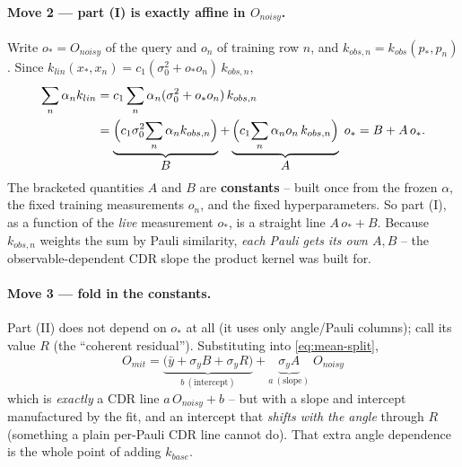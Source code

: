 \documentclass[11pt]{article}
\def\bm#1{#1}%
\def\mathrm#1{#1}%
\begin{document}
\paragraph{Move 2 --- part (I) is exactly affine in $O_{\mathrm{noisy}}$.}
Write $o_*=O_{\mathrm{noisy}}$ of the query and $o_n$ of training row $n$, and
$k_{\mathrm{obs},n}=k_{\mathrm{obs}}(\bm p_*,\bm p_n)$. Since
$k_{\mathrm{lin}}(\bm x_*,\bm x_n)=c_1(\sigma_0^2+o_* o_n)\,k_{\mathrm{obs},n}$,
\begin{align}
\sum_n\alpha_n k_{\mathrm{lin}}
&=c_1\sum_n\alpha_n(\sigma_0^2+o_* o_n)\,k_{\mathrm{obs},n}\notag\\
&=\underbrace{\Big(c_1\sigma_0^2\!\sum_n\alpha_n k_{\mathrm{obs},n}\Big)}_{\textstyle B}
+\underbrace{\Big(c_1\!\sum_n\alpha_n o_n\,k_{\mathrm{obs},n}\Big)}_{\textstyle A}\;o_*
=B+A\,o_* .
\label{eq:AB}
\end{align}
The bracketed quantities $A$ and $B$ are \textbf{constants} -- built once from the
frozen $\bm\alpha$, the fixed training measurements $o_n$, and the fixed
hyperparameters. So part (I), as a function of the \emph{live} measurement $o_*$,
is a straight line $A\,o_*+B$. Because $k_{\mathrm{obs},n}$ weights the sum by
Pauli similarity, \emph{each Pauli gets its own $A,B$} -- the observable-dependent
CDR slope the product kernel was built for.

\paragraph{Move 3 --- fold in the constants.}
Part (II) does not depend on $o_*$ at all (it uses only angle/Pauli columns); call
its value $R$ (the ``coherent residual''). Substituting into
\eqref{eq:mean-split},
\begin{equation}
\boxed{\;O_{\mathrm{mit}}
=\underbrace{\big(\bar y+\sigma_y B+\sigma_y R\big)}_{\textstyle b\ (\text{intercept})}
+\underbrace{\sigma_y A}_{\textstyle a\ (\text{slope})}\;O_{\mathrm{noisy}}\;}
\end{equation}
which is \emph{exactly} a CDR line $a\,O_{\mathrm{noisy}}+b$ -- but with a slope and
intercept manufactured by the fit, and an intercept that \emph{shifts with the
angle} through $R$ (something a plain per-Pauli CDR line cannot do). That extra
angle dependence is the whole point of adding $k_{\mathrm{base}}$.
\end{document}
